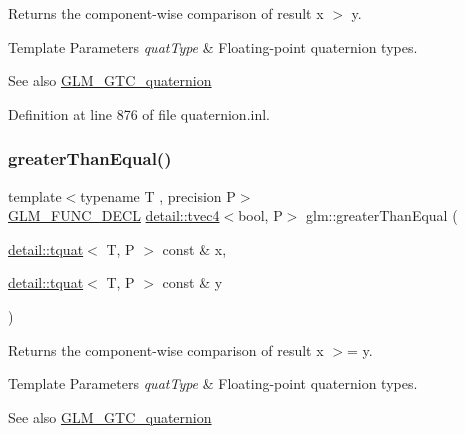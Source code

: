 Returns the component-\/wise comparison of result x $>$ y.


\begin{DoxyTemplParams}{Template Parameters}
{\em quat\+Type} & Floating-\/point quaternion types.\\
\hline
\end{DoxyTemplParams}
\begin{DoxySeeAlso}{See also}
\hyperlink{group__gtc__quaternion}{G\+L\+M\+\_\+\+G\+T\+C\+\_\+quaternion} 
\end{DoxySeeAlso}


Definition at line 876 of file quaternion.\+inl.

\mbox{\label{group__gtc__quaternion_gac90d5af34a03cd665a349ac30e4cc44c}} 
\subsubsection{\texorpdfstring{greater\+Than\+Equal()}{greaterThanEqual()}}
{\footnotesize\ttfamily template$<$typename T , precision P$>$ \\
\hyperlink{setup_8hpp_ab2d052de21a70539923e9bcbf6e83a51}{G\+L\+M\+\_\+\+F\+U\+N\+C\+\_\+\+D\+E\+CL} \hyperlink{structglm_1_1detail_1_1tvec4}{detail\+::tvec4}$<$bool, P$>$ glm\+::greater\+Than\+Equal (\begin{DoxyParamCaption}\item[{\hyperlink{structglm_1_1detail_1_1tquat}{detail\+::tquat}$<$ T, P $>$ const \&}]{x,  }\item[{\hyperlink{structglm_1_1detail_1_1tquat}{detail\+::tquat}$<$ T, P $>$ const \&}]{y }\end{DoxyParamCaption})}

Returns the component-\/wise comparison of result x $>$= y.


\begin{DoxyTemplParams}{Template Parameters}
{\em quat\+Type} & Floating-\/point quaternion types.\\
\hline
\end{DoxyTemplParams}
\begin{DoxySeeAlso}{See also}
\hyperlink{group__gtc__quaternion}{G\+L\+M\+\_\+\+G\+T\+C\+\_\+quaternion} 
\end{DoxySeeAlso}


